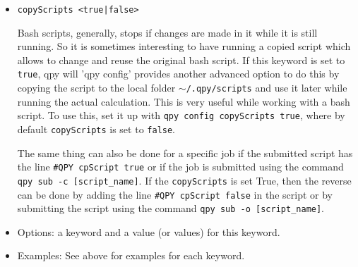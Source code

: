 \documentclass[a4paper,12pt]{article}
\begin{document}
\begin{itemize}
  \begin{lstlisting}[style=BashStyle]
+\$+ qpy check
100 (running):bash my_script.sh (on comp1; wd: /home/users/)
+\$+ qpy config checkFMT '%j: %s\n'
Check pattern modified to '%j: %s\n'
+\$+ qpy check
100: running
+\$+ qpy config checkFMT '%j (%s)\n\tSubmitted from %d\n\tStarted at %S\n-----\n'
Check pattern modified to '%j (%s)\n\tSubmitted from %d\n\tStarted at %S\n-----\n'
+\$+ qpy check
100 (running)
        Submitted from /home/users/
        Started at 2018-10-04 18:01:45.948201
-----
+\$+ qpy config checkFMT default
Check pattern restored to the default value: '%j (%s):%c (on %n; wd: %d)\n'.
+\$+ qpy check
100 (running):bash my_script.sh (on comp1; wd: /home/users/)
  \end{lstlisting}

  The \texttt{\textbackslash n} is important, and it means ``new line''.
  Without it, all jobs are printed in the same line.
  One can also use \texttt{\textbackslash t} to insert a tabulation, as the example shows.

\item \texttt{copyScripts <true|false>}

  Bash scripts, generally, stops if changes are made in it while it is still running.
  So it is sometimes interesting to have \qpy{} running a copied script which allows to change and reuse the original bash script.
  If this keyword is set to \texttt{true}, qpy will 
  'qpy config' provides another advanced option to do this by copying the script to the local folder \texttt{$\sim$/.qpy/scripts} and use it later while running the actual calculation.
  This is very useful while working with a bash script.
  To use this, set it up with \texttt{qpy config copyScripts true}, where by default \texttt{copyScripts} is set to \texttt{false}. 
  
  The same thing can also be done for a specific job if the submitted script has the line \texttt{\#QPY cpScript true} or if the job is submitted using the command \texttt{qpy sub -c [script\_name]}.
  If the \texttt{copyScripts} is set True, then the reverse can be done by adding the line \texttt{\#QPY cpScript false} in the script or by submitting the script using the command \texttt{qpy sub -o [script\_name]}.
  
\end{itemize}

\begin{itemize}

\item Options: a keyword and a value (or values) for this keyword.

\item Examples: See above for examples for each keyword.

\end{itemize}
\end{document}
